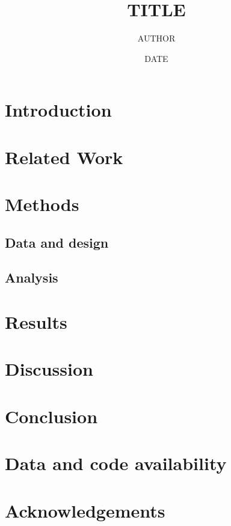 \documentclass[11pt,a4paper]{article}
\title{{{TITLE}}}
\author{{{AUTHOR}}}
\date{{{DATE}}}
\begin{document}
\maketitle
\begin{abstract}
\end{abstract}
\section{Introduction}\label{sec:intro}
\section{Related Work}\label{sec:related}
\section{Methods}\label{sec:methods}
\subsection{Data and design}
\subsection{Analysis}
\section{Results}\label{sec:results}
\section{Discussion}\label{sec:discussion}
\section{Conclusion}\label{sec:conclusion}
\section*{Data and code availability}
\section*{Acknowledgements}
\printbibliography
\end{document}
